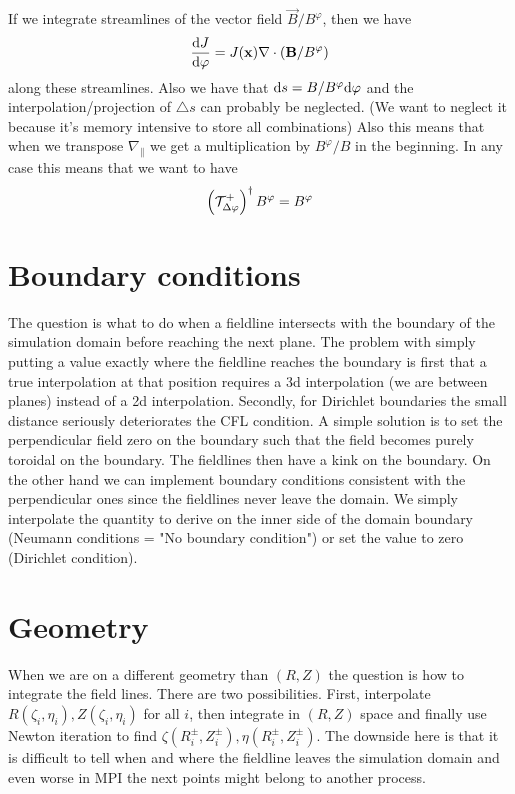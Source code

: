 If we integrate streamlines of the vector field $\vec B/B^\varphi$, then we have
\begin{align}
    \frac{\mathrm{d} J}{\mathrm{d} \varphi} = J({\mathbf{x}} ) \nabla\cdot\left( {\mathbf{B}}/B^\varphi\right)
    \label{}
\end{align}
along these streamlines.
Also we have that $\mathrm{d} s = B/B^\varphi \mathrm{d} \varphi $ and the interpolation/projection of $\triangle s$ can probably be neglected. (We want to neglect it because it's memory intensive to store all combinations)
Also this means that when we transpose $\nabla_\parallel$ we get a 
multiplication by $B^\varphi/B$ in the beginning.
In any case this means that we want to have 
\begin{align}
\left(\mathcal T^+_{\Delta\varphi}\right)^\dagger B^\varphi  =  B^\varphi
\end{align}
\section{Boundary conditions}
The question is what to do when a fieldline intersects with the boundary
of the simulation domain before reaching the next plane.
The problem with simply putting a value exactly where the fieldline 
reaches the boundary is first that a true interpolation at that 
position requires a 3d interpolation (we 
are between planes) instead of a 2d interpolation.
Secondly, for Dirichlet boundaries the small 
distance seriously deteriorates the CFL condition.
A simple solution is to set the perpendicular field zero on the 
boundary such that the field becomes purely 
toroidal on the boundary. The fieldlines then have a kink on the 
boundary. On the other hand we can implement boundary conditions consistent with 
the perpendicular ones since the fieldlines never leave the domain. 
We simply interpolate the quantity to derive on the inner side of the
domain boundary (Neumann conditions = "No boundary condition") or 
set the value to zero (Dirichlet condition).


\section{Geometry}
When we are on a different geometry than $(R,Z)$ the question is how to integrate the field lines. There are two possibilities. 
First, interpolate $R(\zeta_i, \eta_i), Z(\zeta_i, \eta_i)$ for 
all $i$, then integrate in $(R,Z)$ space and finally use
Newton iteration to find $\zeta(R^\pm_i, Z^\pm_i), \eta(R^\pm_i, Z^\pm_i)$. 
The downside here is that it is difficult to tell when and where the fieldline leaves the simulation domain and even worse in MPI the next points might belong to another process. 

